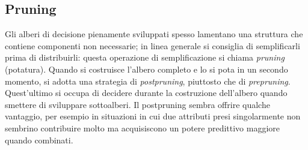 \subsection{Pruning}
Gli alberi di decisione pienamente sviluppati spesso lamentano una struttura che contiene componenti non necessarie; in linea generale si consiglia di semplificarli prima di distribuirli: questa operazione di semplificazione si chiama \textit{pruning} (potatura).
Quando si costruisce l'albero completo e lo si pota in un secondo momento, si adotta una strategia di \textit{postpruning}, piuttosto che di \textit{prepruning}. Quest'ultimo si occupa di decidere durante la costruzione dell'albero quando smettere di sviluppare sottoalberi. Il postpruning sembra offrire qualche vantaggio, per esempio in situazioni in cui due attributi presi singolarmente non sembrino contribuire molto ma acquisiscono un potere predittivo maggiore quando combinati. 

